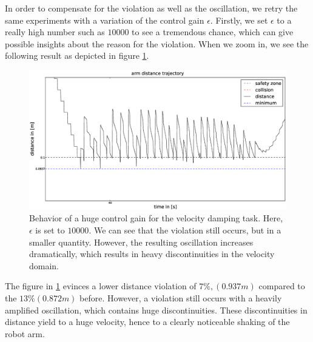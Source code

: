In order to compensate for the violation as well as the oscillation, we retry the same experiments with a variation of the control gain $\epsilon$. 
Firstly, we set $\epsilon$ to a really high number such as $10000$ to see a tremendous chance, which can give possible insights about the reason for the violation. When we zoom in, we see the following result as depicted in figure \ref{fig:objmovesdistancek10000}.
\begin{figure}
  \centering
    \includegraphics[width=\textwidth]{../figures/object_moves/distancek10000.eps}
    \caption{Behavior of a huge control gain for the velocity damping task. Here, $\epsilon$ is set to $10000$. We can see that the violation still occurs, but in a smaller quantity. However, the resulting oscillation increases dramatically, which results in heavy discontinuities in the velocity domain.}
    \label{fig:objmovesdistancek10000}
\end{figure}

The figure in \ref{fig:objmovesdistancek10000} evinces a lower distance violation of $7\%, (0.937m)$ compared to the $13\% (0.872m)$ before. However, a violation still occurs with a heavily amplified oscillation, which contains huge discontinuities. These discontinuities in distance yield to a huge velocity, hence to a clearly noticeable shaking of the robot arm.

